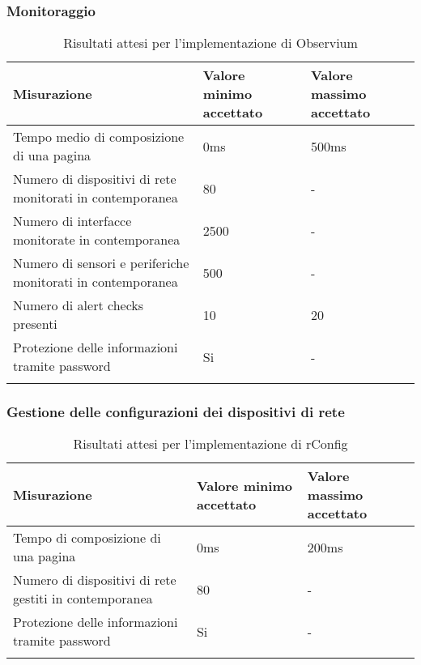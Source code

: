 \documentclass[Tesi.tex]{subfiles}
\begin{document}
\subsubsection{Monitoraggio}
\label{table:Risultati attesi per l'implementazione di Observium}
\renewcommand*{\arraystretch}{1.2}
\begin{longtable}[H]{p{8cm}p{2cm}p{2cm}}
	\rowcolor{CHeader}
	\color{CHeaderText} \textbf{Misurazione} & \color{CHeaderText} \textbf{Valore minimo accettato} & \color{CHeaderText} \textbf{Valore massimo accettato} \\
	\endhead
	Tempo medio di composizione di una pagina
	& 0ms & 500ms \\
	Numero di dispositivi di rete monitorati in contemporanea
	& 80 & - \\
	Numero di interfacce monitorate in contemporanea
	& 2500 & - \\
	Numero di sensori e periferiche monitorati in contemporanea
	& 500 & - \\
	Numero di alert checks presenti
	& 10 & 20 \\
	Protezione delle informazioni tramite password
	& Si & - \\
	\hiderowcolors
	\caption{Risultati attesi per l'implementazione di Observium}
\end{longtable}

\subsubsection{Gestione delle configurazioni dei dispositivi di rete}
\label{table:Risultati attesi per l'implementazione di rConfig}
\renewcommand*{\arraystretch}{1.2}
\begin{longtable}[H]{p{8cm}p{2cm}p{2cm}}
	\rowcolor{CHeader}
	\color{CHeaderText} \textbf{Misurazione} & \color{CHeaderText} \textbf{Valore minimo accettato} & \color{CHeaderText} \textbf{Valore massimo accettato} \\
	\endhead
	Tempo di composizione di una pagina
	& 0ms & 200ms \\
	Numero di dispositivi di rete gestiti in contemporanea
	& 80 & - \\
	Protezione delle informazioni tramite password
	& Si & - \\
	\hiderowcolors
	\caption{Risultati attesi per l'implementazione di rConfig}
\end{longtable}

\newpage
\end{document}
